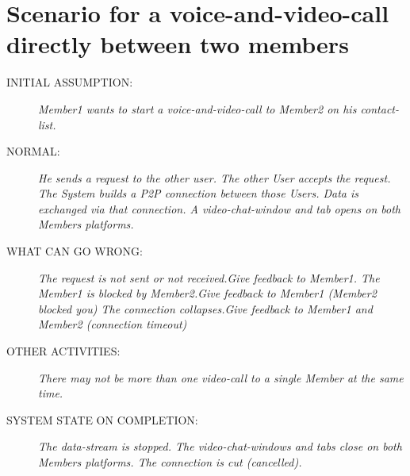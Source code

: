 \section{Scenario for a voice-and-video-call directly between two members}
\begin{description}
 \item [INITIAL ASSUMPTION:]
  \textit{Member1 wants to start a voice-and-video-call to Member2 on his contact-list.}

 \item [NORMAL:]
  \textit{He sends a request to the other user. The other User accepts the request. The System builds a P2P
  connection between those Users. Data is exchanged via that connection. A video-chat-window and tab opens 
  on both Members platforms.}


 \item [WHAT CAN GO WRONG:]

  \textit{The request is not sent or not received.Give feedback to Member1.\newline
  The Member1 is blocked by Member2.Give feedback to Member1 (Member2 blocked you) \newline
  The connection collapses.Give feedback to Member1 and Member2 (connection timeout)}

 \item [OTHER ACTIVITIES:]
  \textit{There may not be more than one video-call to a single Member at the same time.}

 \item [SYSTEM STATE ON COMPLETION:]
  \textit{The data-stream is stopped. The video-chat-windows and tabs close on both Members platforms. The connection is cut (cancelled).}
\end{description}

